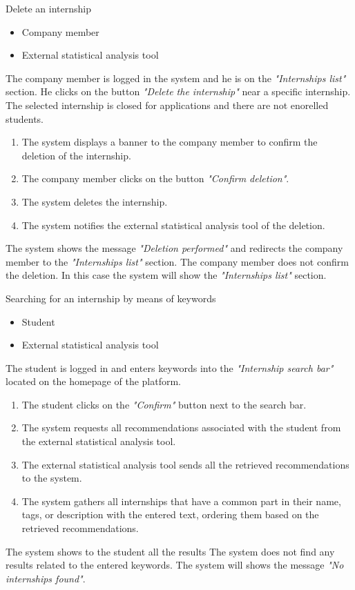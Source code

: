 \usecase
{Delete an internship}
{
    \begin{itemize}
        \item Company member
        \item External statistical analysis tool
    \end{itemize}
}{
    The company member is logged in the system and he is on the \textit{"Internships list"} section. He clicks on the button \textit{"Delete the internship"} near a specific internship. The selected internship is closed for applications and there are not enorelled students.
}{
    \begin{enumerate}
        \item The system displays a banner to the company member to confirm the deletion of the internship.
        \item The company member clicks on the button \textit{"Confirm deletion"}.
        \item The system deletes the internship.
        \item The system notifies the external statistical analysis tool of the deletion.
    \end{enumerate}
}{
    The system shows the message \textit{"Deletion performed"} and redirects the company member to the \textit{"Internships list"} section.
}{
    The company member does not confirm the deletion. In this case the system will show the \textit{"Internships list"} section.
}{

}

\usecase
{Searching for an internship by means of keywords}
{
    \begin{itemize}
        \item Student
        \item External statistical analysis tool
    \end{itemize}
}
{
    The student is logged in and enters keywords into the \textit{"Internship search bar"} located on the homepage of the platform.
}
{
    \begin{enumerate}
        \item The student clicks on the \textit{"Confirm"} button next to the search bar.
        \item The system requests all recommendations associated with the student from the external statistical analysis tool.
        \item The external statistical analysis tool sends all the retrieved recommendations to the system.
        \item The system gathers all internships that have a common part in their name, tags, or description with the entered text, ordering them based on the retrieved recommendations.
    \end{enumerate}
}
{
    The system shows to the student all the results
}
{
    The system does not find any results related to the entered keywords. The system will shows the message \textit{"No internships found"}.
}
{

}

